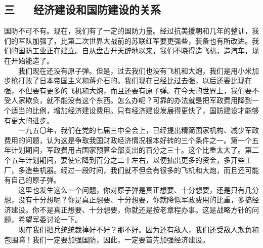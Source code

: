 \documentclass[cn,11pt,chinese]{elegantbook}
\def\myformat#1{\hfil\hfil #1}
\begin{document}
\subsection*{\myformat{三 　  经济建设和国防建设的关系}}
国防不可不有。现在，我们有了一定的国防力量。经过抗美援朝和几年的整训，我们的军队加强了，比第二次世界大战前的苏联红军要更强些，装备也有所改进。我们的国防工业正在建立。自从盘古开天辟地以来，我们不晓得造飞机，造汽车，现在开始能造了。\\
　　我们现在还没有原子弹。但是，过去我们也没有飞机和大炮，我们是用小米加步枪打败了日本帝国主义和蒋介石的。我们现在已经比过去强，以后还要比现在强，不但要有更多的飞机和大炮，而且还要有原子弹。在今天的世界上，我们要不受人家欺负，就不能没有这个东西。怎么办呢？可靠的办法就是把军政费用降到一个适当的比例，增加经济建设费用。只有经济建设发展得更快了，国防建设才能够有更大的进步。\\
　　一九五〇年，我们在党的七届三中全会上，已经提出精简国家机构、减少军政费用的问题，认为这是争取我国财政经济情况根本好转的三个条件之一。第一个五年计划期间，军政费用占国家预算全部支出的百分之三十。这个比重太大了。第二个五年计划期间，要使它降到百分之二十左右，以便抽出更多的资金，多开些工厂，多造些机器。经过一段时间，我们就不但会有很多的飞机和大炮，而且还可能有自己的原子弹。\\
　　这里也发生这么一个问题，你对原子弹是真正想要、十分想要，还是只有几分想，没有十分想呢？你是真正想要、十分想要，你就降低军政费用的比重，多搞经济建设。你不是真正想要、十分想要，你就还是按老章程办事。这是战略方针的问题，希望军委讨论一下。\\
　　现在我们把兵统统裁掉好不好？那不好。因为还有敌人，我们还受敌人欺负和包围嘛！我们一定要加强国防，因此，一定要首先加强经济建设。\\
\end{document}
